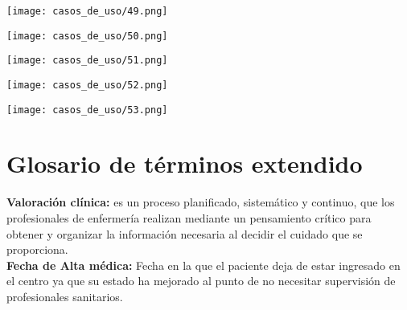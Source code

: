 \documentclass[12pt, spanish]{article}
\begin{document}
\pagebreak
\begin{centering}\texttt{[image: casos\_de\_uso/49.png]}\\[1.0 cm]\end{centering}
\pagebreak
\begin{centering}\texttt{[image: casos\_de\_uso/50.png]}\\[1.0 cm]\end{centering}
\pagebreak
\begin{centering}\texttt{[image: casos\_de\_uso/51.png]}\\[1.0 cm]\end{centering}
\pagebreak
\begin{centering}\texttt{[image: casos\_de\_uso/52.png]}\\[1.0 cm]\end{centering}
\pagebreak
\begin{centering}\texttt{[image: casos\_de\_uso/53.png]}\\[1.0 cm]\end{centering}
\pagebreak


\section{Glosario de términos extendido}

\textbf{Valoración clínica:} es un proceso planificado, sistemático y continuo, que los profesionales de enfermería realizan mediante un pensamiento crítico para obtener y organizar la información necesaria al decidir el cuidado que se proporciona.\\

\textbf{Fecha de Alta médica:} Fecha en la que el paciente deja de estar ingresado en el centro ya que su estado ha mejorado al punto de no necesitar supervisión de profesionales sanitarios.
\end{document}
